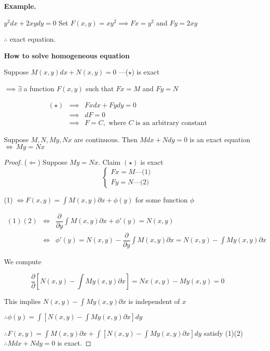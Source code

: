 \textbf{Example.}

$y^2 dx + 2xy dy = 0$ Set $F(x,y) = xy^2 \implies Fx = y^2$ and $Fy = 2xy$

$\therefore$ exact equation.

\textbf{How to solve homogeneous equation}

Suppose $M(x,y)dx + N(x,y) = 0$ ---($\star$) is exact

$\implies \exists$ a function $F(x,y)$ such that $Fx = M$ and $Fy = N$

\begin{eqnarray*}
	(\star) &\implies& Fxdx + Fydy = 0\\
	&\implies& dF = 0\\
	&\implies& F = C, \text{ where $C$ is an arbitrary constant}
\end{eqnarray*}

\begin{thm*}
	Suppose $M,N,My,Nx$ are continuous. Then $Mdx + Ndy = 0$ is an exact equation $\Leftrightarrow ~ My = Nx$
\end{thm*}

\begin{proof}
	($\Leftarrow$) Suppose $My = Nx$. Claim $(\star)$ is exact
	$$\begin{cases}
		Fx = M \text{---(1)}\\
		Fy = N \text{---(2)}
	\end{cases}$$
	
	(1) $\Leftrightarrow F(x,y) = \int M(x,y)\partial x + \phi(y)$ for some function $\phi$
	
	\begin{eqnarray*}
		(1)(2) &\Leftrightarrow& \dfrac{\partial}{\partial y} \int M(x,y)\partial x + \phi'(y) = N(x,y)\\
	&\Leftrightarrow& \phi'(y) = N(x,y) - \dfrac{\partial}{\partial y}\int M(x,y)\partial x = N(x,y) - \int My(x,y)\partial x
	\end{eqnarray*}
	
	We compute
	
	$$\dfrac{\partial}{\partial}\left[N(x,y)- \int My(x,y)\partial x\right] = Nx(x,y) - My(x,y) = 0$$
	
	This implies $N(x,y) - \int My(x,y)\partial x$ is independent of $x$
	
	$\therefore \phi(y) = \int\left[N(x,y) - \int My(x,y)\partial x\right]dy$
	
	$\therefore F(x,y) = \int M(x,y)\partial x + \int \left[N(x,y) - \int My(x,y)\partial x \right]dy$ satisfy (1)(2) $\therefore Mdx + Ndy = 0$ is exact. 
	
\end{proof}

